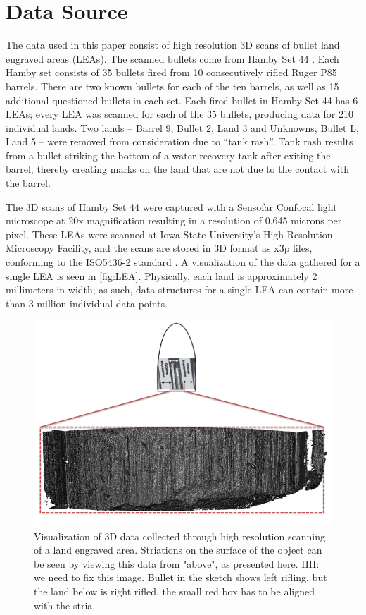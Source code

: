 \documentclass[]{article}
\begin{document}
\section{Data Source}

The data used in this paper consist of high resolution 3D scans of
bullet land engraved areas (LEAs). The scanned bullets come from Hamby
Set 44 \citep{Hamby}. Each Hamby set consists of 35 bullets fired from
10 consecutively rifled Ruger P85 barrels. There are two known bullets
for each of the ten barrels, as well as 15 additional questioned bullets
in each set. Each fired bullet in Hamby Set 44 has 6 LEAs; every LEA was
scanned for each of the 35 bullets, producing data for 210 individual
lands. Two lands -- Barrel 9, Bullet 2, Land 3 and Unknowns, Bullet L,
Land 5 -- were removed from consideration due to ``tank rash''. Tank
rash results from a bullet striking the bottom of a water recovery tank
after exiting the barrel, thereby creating marks on the land that are
not due to the contact with the barrel.

The 3D scans of Hamby Set 44 were captured with a Sensofar Confocal
light microscope at 20x magnification resulting in a resolution of 0.645
microns per pixel. These LEAs were scanned at Iowa State University's
High Resolution Microscopy Facility, and the scans are stored in 3D
format as x3p files, conforming to the ISO5436-2 standard
\citep{ISO5436}. A visualization of the data gathered for a single LEA
is seen in \autoref{fig:LEA}. Physically, each land is approximately 2
millimeters in width; as such, data structures for a single LEA can
contain more than 3 million individual data points.

\begin{figure}
\includegraphics[width=\textwidth]{./images/3d_plot_top_context} \caption{Visualization of 3D data collected through high resolution scanning of a land engraved area. Striations on the surface of the object can be seen by viewing this data from "above", as presented here. HH: we need to fix this image. Bullet in the sketch shows left rifling, but the land below is right rifled. the small red box has to be aligned with the stria. }\label{fig:LEA}
\end{figure}
\end{document}
